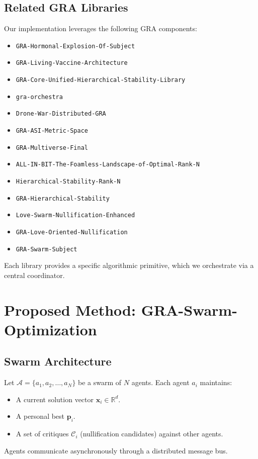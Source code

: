 \documentclass[12pt,a4paper]{article}
\begin{document}
\subsection{Related GRA Libraries}
\label{sec:libraries}
Our implementation leverages the following GRA components:
\begin{itemize}
    \item \texttt{GRA-Hormonal-Explosion-Of-Subject}
    \item \texttt{GRA-Living-Vaccine-Architecture}
    \item \texttt{GRA-Core-Unified-Hierarchical-Stability-Library}
    \item \texttt{gra-orchestra}
    \item \texttt{Drone-War-Distributed-GRA}
    \item \texttt{GRA-ASI-Metric-Space}
    \item \texttt{GRA-Multiverse-Final}
    \item \texttt{ALL-IN-BIT-The-Foamless-Landscape-of-Optimal-Rank-N}
    \item \texttt{Hierarchical-Stability-Rank-N}
    \item \texttt{GRA-Hierarchical-Stability}
    \item \texttt{Love-Swarm-Nullification-Enhanced}
    \item \texttt{GRA-Love-Oriented-Nullification}
    \item \texttt{GRA-Swarm-Subject}
\end{itemize}
Each library provides a specific algorithmic primitive, which we orchestrate via a central coordinator.

\section{Proposed Method: GRA-Swarm-Optimization}

\subsection{Swarm Architecture}
Let $\mathcal{A} = \{a_1, a_2, \dots, a_N\}$ be a swarm of $N$ agents. Each agent $a_i$ maintains:
\begin{itemize}
    \item A current solution vector $\mathbf{x}_i \in \mathbb{R}^d$.
    \item A personal best $\mathbf{p}_i$.
    \item A set of critiques $\mathcal{C}_i$ (nullification candidates) against other agents.
\end{itemize}
Agents communicate asynchronously through a distributed message bus.
\end{document}
